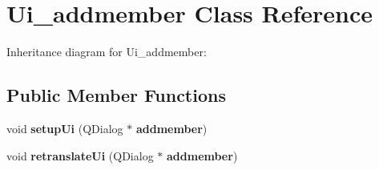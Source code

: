 \section{Ui\+\_\+addmember Class Reference}
\label{class_ui__addmember}


Inheritance diagram for Ui\+\_\+addmember\+:
\subsection*{Public Member Functions}
\begin{DoxyCompactItemize}
\item 
\mbox{\label{class_ui__addmember_af1579b1f5e2a85abe3bf84d4c825848d}} 
void {\bfseries setup\+Ui} (Q\+Dialog $\ast$\textbf{ addmember})
\item 
\mbox{\label{class_ui__addmember_a335ea5186c2d83f6dbbb83f578a3a9ba}} 
void {\bfseries retranslate\+Ui} (Q\+Dialog $\ast$\textbf{ addmember})
\end{DoxyCompactItemize}

